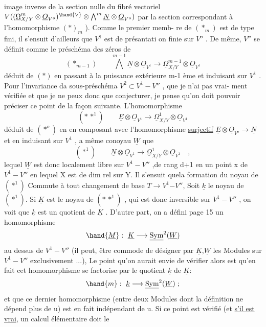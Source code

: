 
image inverse de la section nulle du fibré vectoriel $V((\underline{\Omega}^m_{X/Y}\otimes\underline{O}_{V^o})^{\hand{\vee}}\otimes\bigwedge^m\underline{N}\otimes\underline{O}_{V^o})$
par la section correspondant à l'homomorphisme $(*)_{m}$ ). Comme le premier memb-%
re de $(*_m)$ est de type fini, il s'ensuit d'ailleurs que $V^1$ est de présantati%
on finie sur $V^o$ . De même, $V''$ se définit comme le préschéma des zéros de
\[ (*_{m-1}) \qquad \bigwedge^{m-1}\underline{N}\otimes\underline{O}_{V^1} \longrightarrow \underline{\Omega}^{m-1}_{X/Y}\otimes\underline{O}_{V^1} \]
déduit de $(*)$ en passant à la puissance extérieure m-1 ème et induisant sur
$V^1$ . Pour l'invariance da sous-préschéma $V^2\subset V^1-V''$ , que je n'ai pas vrai-%
ment vérifiée et que je ne peux donc que conjecturer, je pense qu'on doit
pouvoir préciser ce point de la façon suivante. L'homomorphisme
\[ (*\,*^1) \qquad \underline{E}\otimes\underline{O}_{V^1}\longrightarrow\underline{\Omega}^1_{X/Y}\otimes\underline{O}_{V^1} \]
déduit de $(*^o)$ en  en composant avec l'homomorphisme
\uline{surjectif} $\underline{E}\otimes\underline{O}_{V^o}\to\underline{N}$ et en  induisant sur $V^1$ , a même conoyau
$\underline{W}$ que
\[ (*^1) \qquad \underline{N}\otimes\underline{O}_{V^1}\to\underline{\Omega}^1_{X/Y}\otimes\underline{O}_{V^1} \quad , \]
lequel $\underline{W}$ est donc localement libre sur $V^1-V''$ ,\hand{(}de rang d+1 en un point
x de $V^1-V''$ en lequel X est de dim rel  sur Y\hand{)}. Il s'ensuit quela formation
du noyau de $(*^1)$ Commute à tout changement de base $T\to V^1$$-V''$, Soit $\underline{k}$ le
noyau de $(*^1)$. Si $\underline{K}$ est le noyau de $(*\,*^1)$ , qui est donc inversible sur
$V^1-V''$ , on voit  que $\underline{k}$ est un quotient de $\underline{K}$ . D'autre part, on a défini
page 15 un homomorphisme
\[ \hand{\underline{M}} : \ \underline{K}\longrightarrow\underline{\mathrm{Sym}}^2(\underline{W}) \]
au dessus de $V^1-V''$ (il peut, être commode de désigner par $\underline{K}$,$\underline{W}$ les Modules
sur $V^1-V''$ exclusivement ...),  Le point qu'on aurait envie de vérifier
alors est qu'en fait cet homomorphisme se factorise par le quotient $\underline{k}$ de $\underline{K}$:
\[ \hand{m} : \ \underline{k}\longrightarrow\underline{\mathrm{Sym}}^2(\underline{W}) \  ; \]
et que ce dernier homomorphisme (entre deux Modules dont la définition ne
 dépend plus de u) est en fait indépendant de
u. Si ce point est vérifié (et \uline{s'il est vrai}, un calcul élémentaire doit le

